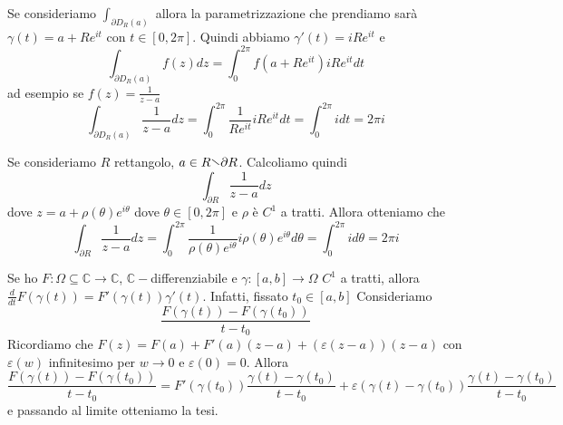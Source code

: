 \begin{example}
    Se consideriamo \(\int_{\partial D_R (a)} \) allora la parametrizzazione che
    prendiamo sarà \(\gamma(t) = a + Re^{it}\) con \(t \in [0, 2\pi]\). Quindi
    abbiamo \(\gamma'(t) = iRe^{it}\) e 
    \[
        \int_{\partial D_R(a)} f(z) dz = \int_{0}^{2\pi} f(a + Re^{it}) iRe^{it}
        dt   
    \]
    ad esempio se \(\displaystyle f(z) = \frac{1}{z-a}\) 
    \[
        \int_{\partial D_R(a)} \frac{1}{z-a} dz = \int_{0}^{2\pi} \frac{1}{Re^{it}}
        iRe^{it} dt = \int_{0}^{2\pi} i dt = 2\pi i
    \]
\end{example}
\begin{example}
    Se consideriamo \(R\) rettangolo, \(a \in R\sminus \partial R\). Calcoliamo
    quindi
    \[
        \int_{\partial R} \frac{1}{z-a} dz
    \]
    dove \(z = a + \rho(\theta) e^{i\theta} \) dove \(\theta \in [0, 2\pi]\) e
    \(\rho\) è \(C^{1}\) a tratti. Allora otteniamo che
    \[
        \int_{\partial R} \frac{1}{z-a} dz = \int_{0}^{2\pi} \frac{1}{\rho(\theta)
        e^{i\theta}} i \rho(\theta) e^{i\theta} d\theta = \int_{0}^{2\pi} i d\theta
        = 2\pi i
    \]
\end{example}
\begin{remark}
    Se ho \(F : \Omega \subseteq \mathbb{C} \to \mathbb{C} \), 
    \(\mathbb{C}-\)differenziabile e \(\gamma : [a,b] \to \Omega\) \(C^{1}\) a
    tratti, allora \(\displaystyle \frac{d}{dt}F{(\gamma{(t)})} =
    F'{(\gamma{(t)})}\gamma'{(t)}\). Infatti, fissato \(t_{0}\in [a,b]\)
    Consideriamo
    \[
        \frac{F{(\gamma{(t)})}-F{(\gamma{(t_{0})})}}{t-t_{0}}
    \]
    Ricordiamo che \(F(z) = F{(a)} + F'{(a)}{(z-a)} + {(\varepsilon
    {(z-a)})}{(z-a)}\) con \(\varepsilon {(w)}\) infinitesimo per \(w\to 0\) e
    \(\varepsilon {(0)} = 0\). Allora
    \[
        \frac{F{(\gamma{(t)})}- F{(\gamma{(t_{0})})}}{t-t_{0}} =
        F'{(\gamma{(t_{0})})}\frac{\gamma{(t)}-\gamma{(t_{0})}}{t-t_{0}} +
        \varepsilon{(\gamma{(t)}-\gamma{(t_{0})})}
        \frac{\gamma{(t)}-\gamma{(t_{0})}}{t-t_{0}}
    \]
    e passando al limite otteniamo la tesi.
\end{remark}
